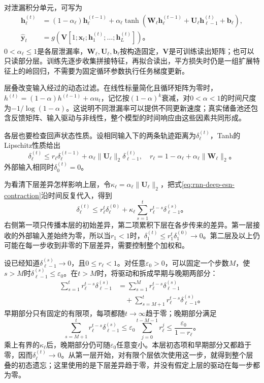 对泄漏积分单元，可写为
\begin{equation}
  \begin{aligned}
    \bm h_\ell^{(t)}&=(1-\alpha_\ell)\bm h_\ell^{(t-1)}
      +\alpha_\ell\tanh\!\left(\bm W_\ell\bm h_\ell^{(t-1)}
               +\bm U_\ell\bm h_{\ell-1}^{(t)}+\bm b_\ell\right),\\
    \widehat{\bm y}_t&=g\!\left(\bm V
       [1;\bm x_t;\bm h_1^{(t)};\ldots;\bm h_L^{(t)}]\right)\text{。}
  \end{aligned}
  \label{eq:rnn-deep-esn}
\end{equation}
$0<\alpha_\ell\leq1$是各层泄漏率，$\bm W_\ell,\bm U_\ell,\bm b_\ell$按构造固定，$\bm V$是可训练读出矩阵；也可以只读部分层。训练先逐步收集拼接特征，再拟合读出，平方损失时仍是一组扩展特征上的岭回归，不需要为固定循环参数执行任务梯度更新。

层叠改变输入经过的动态过滤。在线性标量简化且循环矩阵为零时，$h^{(t)}=(1-\alpha)h^{(t-1)}+\alpha u_t$，记忆按$(1-\alpha)^k$衰减，对$0<\alpha<1$的时间尺度为$-1/\log(1-\alpha)$。这说明不同泄漏率可以提供不同更新速度；真实储备池还包含反馈矩阵、输入驱动与非线性，整个模型的时间响应由这些因素共同形成。

各层也要检查回声状态性质。设相同输入下的两条轨迹距离为$\delta_\ell^{(t)}$，Tanh的Lipschitz性质给出
\begin{equation}
  \delta_\ell^{(t)}\leq r_\ell\delta_\ell^{(t-1)}
       +\alpha_\ell\lVert\bm U_\ell\rVert_2\delta_{\ell-1}^{(t)},
  \quad r_\ell=1-\alpha_\ell+\alpha_\ell\lVert\bm W_\ell\rVert_2\text{。}
  \label{eq:rnn-deep-esn-contraction}
\end{equation}
外部输入相同时$\delta_0^{(t)}=0$。

为看清下层差异怎样影响上层，令$\kappa_\ell=\alpha_\ell\lVert\bm U_\ell\rVert_2$，把式\eqref{eq:rnn-deep-esn-contraction}沿时间反复代入，得到
\[
 \delta_\ell^{(t)}
 \leq r_\ell^t\delta_\ell^{(0)}
   +\kappa_\ell\sum_{s=1}^{t}r_\ell^{t-s}\delta_{\ell-1}^{(s)}\text{。}
\]
右侧第一项只传播本层的初始差异，第二项累积下层在各步传来的差异。第一层接收的外部输入差始终为零，所以当$r_1<1$时，$\delta_1^{(t)}\leq r_1^t\delta_1^{(0)}\to0$。第二层及以上仍可能在每一步收到非零的下层差异，需要控制整个加权和。

设已经知道$\delta_{\ell-1}^{(s)}\to0$，且$0\leq r_\ell<1$。对任意$\varepsilon_0>0$，可以固定一个步数$M$，使$s>M$时$\delta_{\ell-1}^{(s)}\leq\varepsilon_0$。在$t>M$时，将驱动和拆成早期与晚期两部分：
\[
 \begin{aligned}
 \sum_{s=1}^{t}r_\ell^{t-s}\delta_{\ell-1}^{(s)}
 &=\sum_{s=1}^{M}r_\ell^{t-s}\delta_{\ell-1}^{(s)}\\
 &\quad+\sum_{s=M+1}^{t}r_\ell^{t-s}\delta_{\ell-1}^{(s)}\text{。}
 \end{aligned}
\]
早期部分只有固定的有限项，每项都随$t\to\infty$趋于零；晚期部分满足
\[
 \sum_{s=M+1}^{t}r_\ell^{t-s}\delta_{\ell-1}^{(s)}
 \leq\varepsilon_0\sum_{j=0}^{t-M-1}r_\ell^j
 \leq\frac{\varepsilon_0}{1-r_\ell}\text{。}
\]
乘上有界的$\kappa_\ell$后，晚期部分仍可随$\varepsilon_0$任意变小。本层初态项和早期部分又都趋于零，因而$\delta_\ell^{(t)}\to0$。从第一层开始，对有限个层依次使用这一步，就得到整个层叠的初态遗忘；这里使用的是下层差异趋于零，并没有假定上层的驱动在每一步都为零。

